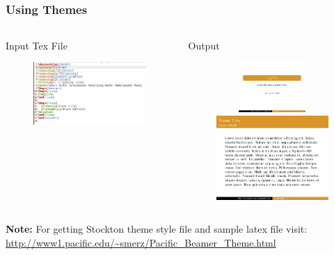 \documentclass[[newPxFont]{beamer}
\begin{document}
\subsection{}
\begin{frame}
  \frametitle{Using Themes}
\begin{columns}
  \begin{column}{.45\textwidth}
\begin{block}{Input Tex File}
\begin{figure}[ht]
    \centering
    \includegraphics[width=2in,height=2.in]{figs/theme.png}
 \end{figure}
 \end{block}
  \end{column}
  \begin{column}{.55\textwidth}
\begin{block}{Output}
    \begin{figure}[ht]
    \centering
    \includegraphics[width=1.75in,height=0.75in]{figs/theme-0.png}\\\includegraphics[width=2in]{figs/theme-1.png} 
  \end{figure}
  \end{block}
  \end{column}
\end{columns}
  \begin{small}
  \textbf{\color{red} Note:} For getting Stockton theme style file and sample latex file visit:
  \url{http://www1.pacific.edu/~smerz/Pacific_Beamer_Theme.html} 
  \end{small} 
  \end{frame}
\end{document}
